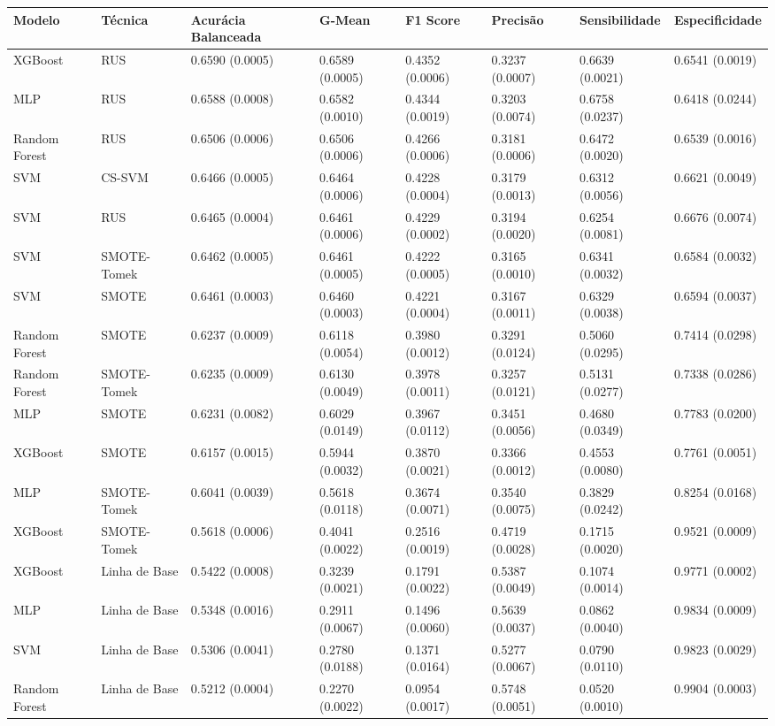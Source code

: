 \begin{tabular}{llllllll}
\toprule
Modelo & Técnica & Acurácia Balanceada & G-Mean & F1 Score & Precisão & Sensibilidade & Especificidade \\
\midrule
XGBoost & RUS & 0.6590 (0.0005) & 0.6589 (0.0005) & 0.4352 (0.0006) & 0.3237 (0.0007) & 0.6639 (0.0021) & 0.6541 (0.0019) \\
MLP & RUS & 0.6588 (0.0008) & 0.6582 (0.0010) & 0.4344 (0.0019) & 0.3203 (0.0074) & 0.6758 (0.0237) & 0.6418 (0.0244) \\
Random Forest & RUS & 0.6506 (0.0006) & 0.6506 (0.0006) & 0.4266 (0.0006) & 0.3181 (0.0006) & 0.6472 (0.0020) & 0.6539 (0.0016) \\
SVM & CS-SVM & 0.6466 (0.0005) & 0.6464 (0.0006) & 0.4228 (0.0004) & 0.3179 (0.0013) & 0.6312 (0.0056) & 0.6621 (0.0049) \\
SVM & RUS & 0.6465 (0.0004) & 0.6461 (0.0006) & 0.4229 (0.0002) & 0.3194 (0.0020) & 0.6254 (0.0081) & 0.6676 (0.0074) \\
SVM & SMOTE-Tomek & 0.6462 (0.0005) & 0.6461 (0.0005) & 0.4222 (0.0005) & 0.3165 (0.0010) & 0.6341 (0.0032) & 0.6584 (0.0032) \\
SVM & SMOTE & 0.6461 (0.0003) & 0.6460 (0.0003) & 0.4221 (0.0004) & 0.3167 (0.0011) & 0.6329 (0.0038) & 0.6594 (0.0037) \\
Random Forest & SMOTE & 0.6237 (0.0009) & 0.6118 (0.0054) & 0.3980 (0.0012) & 0.3291 (0.0124) & 0.5060 (0.0295) & 0.7414 (0.0298) \\
Random Forest & SMOTE-Tomek & 0.6235 (0.0009) & 0.6130 (0.0049) & 0.3978 (0.0011) & 0.3257 (0.0121) & 0.5131 (0.0277) & 0.7338 (0.0286) \\
MLP & SMOTE & 0.6231 (0.0082) & 0.6029 (0.0149) & 0.3967 (0.0112) & 0.3451 (0.0056) & 0.4680 (0.0349) & 0.7783 (0.0200) \\
XGBoost & SMOTE & 0.6157 (0.0015) & 0.5944 (0.0032) & 0.3870 (0.0021) & 0.3366 (0.0012) & 0.4553 (0.0080) & 0.7761 (0.0051) \\
MLP & SMOTE-Tomek & 0.6041 (0.0039) & 0.5618 (0.0118) & 0.3674 (0.0071) & 0.3540 (0.0075) & 0.3829 (0.0242) & 0.8254 (0.0168) \\
XGBoost & SMOTE-Tomek & 0.5618 (0.0006) & 0.4041 (0.0022) & 0.2516 (0.0019) & 0.4719 (0.0028) & 0.1715 (0.0020) & 0.9521 (0.0009) \\
XGBoost & Linha de Base & 0.5422 (0.0008) & 0.3239 (0.0021) & 0.1791 (0.0022) & 0.5387 (0.0049) & 0.1074 (0.0014) & 0.9771 (0.0002) \\
MLP & Linha de Base & 0.5348 (0.0016) & 0.2911 (0.0067) & 0.1496 (0.0060) & 0.5639 (0.0037) & 0.0862 (0.0040) & 0.9834 (0.0009) \\
SVM & Linha de Base & 0.5306 (0.0041) & 0.2780 (0.0188) & 0.1371 (0.0164) & 0.5277 (0.0067) & 0.0790 (0.0110) & 0.9823 (0.0029) \\
Random Forest & Linha de Base & 0.5212 (0.0004) & 0.2270 (0.0022) & 0.0954 (0.0017) & 0.5748 (0.0051) & 0.0520 (0.0010) & 0.9904 (0.0003) \\
\bottomrule
\end{tabular}
